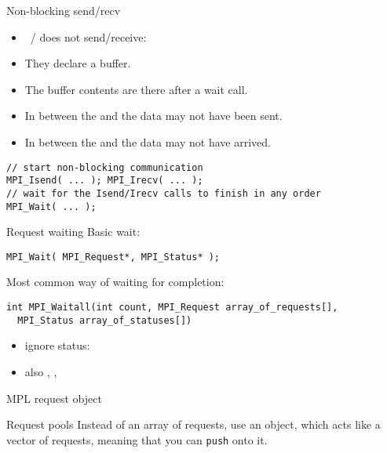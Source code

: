 \begin{numberedframe}{Non-blocking send/recv}
  \begin{itemize}
  \item {}~/  does not send/receive:
  \item They declare a buffer.
  \item The buffer contents are there after a wait call.
  \item In between the  and 
    the data may not have been sent.
  \item In between the  and 
    the data may not have arrived.
  \end{itemize}
\lstset{language=C}
\begin{lstlisting}
// start non-blocking communication
MPI_Isend( ... ); MPI_Irecv( ... );
// wait for the Isend/Irecv calls to finish in any order
MPI_Wait( ... );  
\end{lstlisting}
\end{numberedframe}


\begin{numberedframe}{Request waiting}
Basic wait:
\begin{lstlisting}
MPI_Wait( MPI_Request*, MPI_Status* );
\end{lstlisting}

Most common way of waiting for completion:
\begin{lstlisting}
int MPI_Waitall(int count, MPI_Request array_of_requests[], 
  MPI_Status array_of_statuses[])
\end{lstlisting}
\begin{itemize}
\item ignore status: 
\item also , , 
\end{itemize}
\end{numberedframe}

\begin{mpl}
\begin{numberedframe}{MPL request object}
    
\end{numberedframe}
\begin{numberedframe}{Request pools}
  Instead of an array of requests,
  use an  object,
  which acts like a vector of requests,
  meaning that you can \lstinline+push+ onto it.


  
\end{numberedframe}
\end{mpl}

